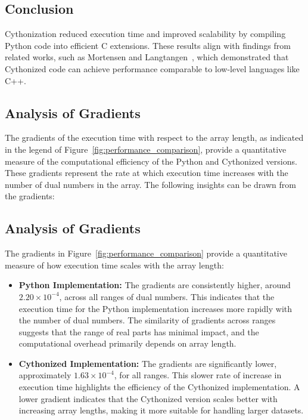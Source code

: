 \documentclass[a4paper,12pt]{article}
\begin{document}
\subsection{Conclusion}
Cythonization reduced execution time and improved scalability by compiling Python code into efficient C extensions. These results align with findings from related works, such as Mortensen and Langtangen~\cite{mortensen2016cython}, which demonstrated that Cythonized code can achieve performance comparable to low-level languages like C++.




\subsection{Analysis of Gradients}
The gradients of the execution time with respect to the array length, as indicated in the legend of Figure~\ref{fig:performance_comparison}, provide a quantitative measure of the computational efficiency of the Python and Cythonized versions. These gradients represent the rate at which execution time increases with the number of dual numbers in the array. The following insights can be drawn from the gradients:

\subsection{Analysis of Gradients}
The gradients in Figure~\ref{fig:performance_comparison} provide a quantitative measure of how execution time scales with the array length:

\begin{itemize}
    \item \textbf{Python Implementation:} The gradients are consistently higher, around \(2.20 \times 10^{-4}\), across all ranges of dual numbers. This indicates that the execution time for the Python implementation increases more rapidly with the number of dual numbers. The similarity of gradients across ranges suggests that the range of real parts has minimal impact, and the computational overhead primarily depends on array length.
    
    \item \textbf{Cythonized Implementation:} The gradients are significantly lower, approximately \(1.63 \times 10^{-4}\), for all ranges. This slower rate of increase in execution time highlights the efficiency of the Cythonized implementation. A lower gradient indicates that the Cythonized version scales better with increasing array lengths, making it more suitable for handling larger datasets.
\end{itemize}
\end{document}
